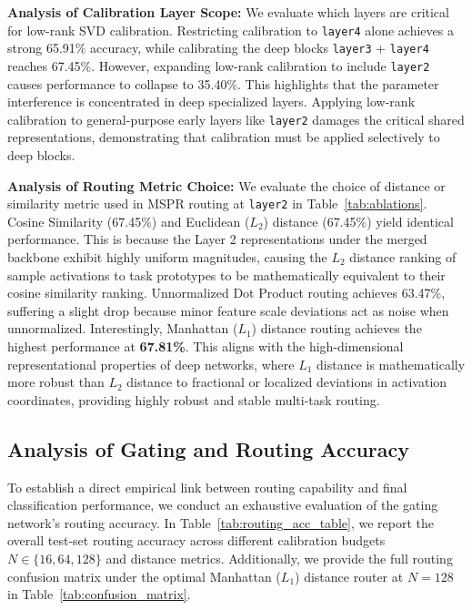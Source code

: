 \documentclass{article}
\theoremstyle{plain}
\theoremstyle{definition}
\theoremstyle{remark}
\begin{document}
\textbf{Analysis of Calibration Layer Scope:} We evaluate which layers are critical for low-rank SVD calibration. Restricting calibration to \texttt{layer4} alone achieves a strong 65.91\% accuracy, while calibrating the deep blocks \texttt{layer3} + \texttt{layer4} reaches 67.45\%. However, expanding low-rank calibration to include \texttt{layer2} causes performance to collapse to 35.40\%. This highlights that the parameter interference is concentrated in deep specialized layers. Applying low-rank calibration to general-purpose early layers like \texttt{layer2} damages the critical shared representations, demonstrating that calibration must be applied selectively to deep blocks.

\textbf{Analysis of Routing Metric Choice:} We evaluate the choice of distance or similarity metric used in MSPR routing at \texttt{layer2} in Table~\ref{tab:ablations}. Cosine Similarity (67.45\%) and Euclidean ($L_2$) distance (67.45\%) yield identical performance. This is because the Layer 2 representations under the merged backbone exhibit highly uniform magnitudes, causing the $L_2$ distance ranking of sample activations to task prototypes to be mathematically equivalent to their cosine similarity ranking. Unnormalized Dot Product routing achieves 63.47\%, suffering a slight drop because minor feature scale deviations act as noise when unnormalized. Interestingly, Manhattan ($L_1$) distance routing achieves the highest performance at \textbf{67.81\%}. This aligns with the high-dimensional representational properties of deep networks, where $L_1$ distance is mathematically more robust than $L_2$ distance to fractional or localized deviations in activation coordinates, providing highly robust and stable multi-task routing.

\subsection{Analysis of Gating and Routing Accuracy}
To establish a direct empirical link between routing capability and final classification performance, we conduct an exhaustive evaluation of the gating network's routing accuracy. In Table~\ref{tab:routing_acc_table}, we report the overall test-set routing accuracy across different calibration budgets $N \in \{16, 64, 128\}$ and distance metrics. Additionally, we provide the full routing confusion matrix under the optimal Manhattan ($L_1$) distance router at $N=128$ in Table~\ref{tab:confusion_matrix}.
\end{document}
